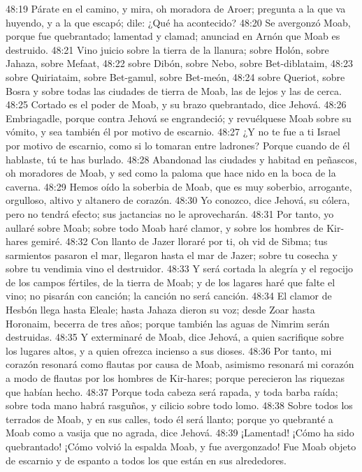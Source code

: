 48:19 Párate en el camino, y mira, oh moradora de Aroer; pregunta a la que va huyendo, y a la que escapó; dile: ¿Qué ha acontecido?  
48:20 Se avergonzó Moab, porque fue quebrantado; lamentad y clamad; anunciad en Arnón que Moab es destruido.  
48:21 Vino juicio sobre la tierra de la llanura; sobre Holón, sobre Jahaza, sobre Mefaat,  
48:22 sobre Dibón, sobre Nebo, sobre Bet-diblataim,  
48:23 sobre Quiriataim, sobre Bet-gamul, sobre Bet-meón,  
48:24 sobre Queriot, sobre Bosra y sobre todas las ciudades de tierra de Moab, las de lejos y las de cerca.  
48:25 Cortado es el poder de Moab, y su brazo quebrantado, dice Jehová.  
48:26 Embriagadle, porque contra Jehová se engrandeció; y revuélquese Moab sobre su vómito, y sea también él por motivo de escarnio.  
48:27 ¿Y no te fue a ti Israel por motivo de escarnio, como si lo tomaran entre ladrones? Porque cuando de él hablaste, tú te has burlado.  
48:28 Abandonad las ciudades y habitad en peñascos, oh moradores de Moab, y sed como la paloma que hace nido en la boca de la caverna.  
48:29 Hemos oído la soberbia de Moab, que es muy soberbio, arrogante, orgulloso, altivo y altanero de corazón.  
48:30 Yo conozco, dice Jehová, su cólera, pero no tendrá efecto; sus jactancias no le aprovecharán.  
48:31 Por tanto, yo aullaré sobre Moab; sobre todo Moab haré clamor, y sobre los hombres de Kir-hares gemiré.  
48:32 Con llanto de Jazer lloraré por ti, oh vid de Sibma; tus sarmientos pasaron el mar, llegaron hasta el mar de Jazer; sobre tu cosecha y sobre tu vendimia vino el destruidor.  
48:33 Y será cortada la alegría y el regocijo de los campos fértiles, de la tierra de Moab; y de los lagares haré que falte el vino; no pisarán con canción; la canción no será canción.  
48:34 El clamor de Hesbón llega hasta Eleale; hasta Jahaza dieron su voz; desde Zoar hasta Horonaim, becerra de tres años; porque también las aguas de Nimrim serán destruidas.  
48:35 Y exterminaré de Moab, dice Jehová, a quien sacrifique sobre los lugares altos, y a quien ofrezca incienso a sus dioses.  
48:36 Por tanto, mi corazón resonará como flautas por causa de Moab, asimismo resonará mi corazón a modo de flautas por los hombres de Kir-hares; porque perecieron las riquezas que habían hecho.  
48:37 Porque toda cabeza será rapada, y toda barba raída; sobre toda mano habrá rasguños, y cilicio sobre todo lomo.  
48:38 Sobre todos los terrados de Moab, y en sus calles, todo él será llanto; porque yo quebranté a Moab como a vasija que no agrada, dice Jehová.  
48:39 ¡Lamentad! ¡Cómo ha sido quebrantado! ¡Cómo volvió la espalda Moab, y fue avergonzado! Fue Moab objeto de escarnio y de espanto a todos los que están en sus alrededores.  
